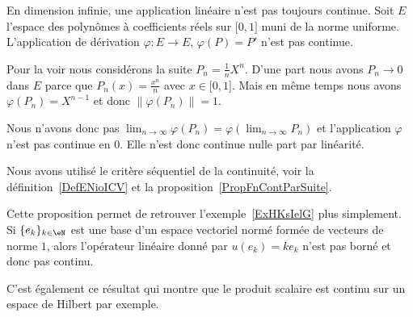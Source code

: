 \begin{example}      \label{EXooDMVJooAJywMU}
	En dimension infinie, une application linéaire n'est pas toujours continue. Soit \( E\) l'espace des polynômes à coefficients réels sur \( \mathopen[ 0 , 1 \mathclose]\) muni de la norme uniforme. L'application de dérivation \( \varphi\colon E\to E\), \( \varphi(P)=P'\) n'est pas continue.

	Pour la voir nous considérons la suite \( P_n=\frac{1}{ n }X^n\). D'une part nous avons \( P_n\to 0\) dans \( E\) parce que \( P_n(x)=\frac{ x^n }{ n }\) avec \( x\in \mathopen[ 0 , 1 \mathclose]\). Mais en même temps nous avons \( \varphi(P_n)=X^{n-1}\) et donc \( \| \varphi(P_n) \|=1\).

	Nous n'avons donc pas \( \lim_{n\to \infty} \varphi(P_n)=\varphi(\lim_{n\to \infty} P_n)\) et l'application \( \varphi\) n'est pas continue en \( 0\). Elle n'est donc continue nulle part par linéarité.

	Nous avons utilisé le critère séquentiel de la continuité, voir la définition~\ref{DefENioICV} et la proposition~\ref{PropFnContParSuite}.
\end{example}

\begin{remark}  \label{RemOAXNooSMTDuN}
	Cette proposition permet de retrouver l'exemple~\ref{ExHKsIelG} plus simplement. Si \( \{ e_k \}_{k\in \eN}\) est une base d'un espace vectoriel normé formée de vecteurs de norme \( 1\), alors l'opérateur linéaire donné par \( u(e_k)=ke_k\) n'est pas borné et donc pas continu.
\end{remark}

C'est également ce résultat qui montre que le produit scalaire est continu sur un espace de Hilbert par exemple.

